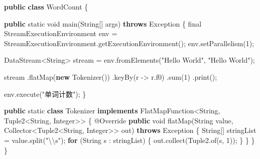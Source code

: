 \documentclass[cn,11pt,chinese]{elegantbook}
\newenvironment{Shaded}{}{}
\newcommand{\AttributeTok}[1]{\textcolor[rgb]{0.49,0.56,0.16}{#1}}
\newcommand{\BuiltInTok}[1]{#1}
\newcommand{\DataTypeTok}[1]{\textcolor[rgb]{0.56,0.13,0.00}{#1}}
\newcommand{\DecValTok}[1]{\textcolor[rgb]{0.25,0.63,0.44}{#1}}
\newcommand{\FunctionTok}[1]{\textcolor[rgb]{0.02,0.16,0.49}{#1}}
\newcommand{\KeywordTok}[1]{\textcolor[rgb]{0.00,0.44,0.13}{\textbf{#1}}}
\newcommand{\NormalTok}[1]{#1}
\newcommand{\SpecialCharTok}[1]{\textcolor[rgb]{0.25,0.44,0.63}{#1}}
\newcommand{\StringTok}[1]{\textcolor[rgb]{0.25,0.44,0.63}{#1}}
\begin{document}
\begin{Shaded}
\begin{Highlighting}[]
\KeywordTok{public} \KeywordTok{class}\NormalTok{ WordCount \{}

    \KeywordTok{public} \DataTypeTok{static} \DataTypeTok{void} \FunctionTok{main}\NormalTok{(}\BuiltInTok{String}\NormalTok{[] args) }\KeywordTok{throws} \BuiltInTok{Exception}\NormalTok{ \{}
        \DataTypeTok{final}\NormalTok{ StreamExecutionEnvironment env = StreamExecutionEnvironment.}\FunctionTok{getExecutionEnvironment}\NormalTok{();}
\NormalTok{        env.}\FunctionTok{setParallelism}\NormalTok{(}\DecValTok{1}\NormalTok{);}

\NormalTok{        DataStream\textless{}}\BuiltInTok{String}\NormalTok{\textgreater{} stream = env.}\FunctionTok{fromElements}\NormalTok{(}\StringTok{"Hello World"}\NormalTok{, }\StringTok{"Hello World"}\NormalTok{);}

\NormalTok{        stream}
\NormalTok{                .}\FunctionTok{flatMap}\NormalTok{(}\KeywordTok{new} \FunctionTok{Tokenizer}\NormalTok{())}
\NormalTok{                .}\FunctionTok{keyBy}\NormalTok{(r {-}\textgreater{} r.}\FunctionTok{f0}\NormalTok{)}
\NormalTok{                .}\FunctionTok{sum}\NormalTok{(}\DecValTok{1}\NormalTok{)}
\NormalTok{                .}\FunctionTok{print}\NormalTok{();}

\NormalTok{        env.}\FunctionTok{execute}\NormalTok{(}\StringTok{"单词计数"}\NormalTok{);}
\NormalTok{    \}}

    \KeywordTok{public} \DataTypeTok{static} \KeywordTok{class}\NormalTok{ Tokenizer }\KeywordTok{implements}\NormalTok{ FlatMapFunction\textless{}}\BuiltInTok{String}\NormalTok{, Tuple2\textless{}}\BuiltInTok{String}\NormalTok{, }\BuiltInTok{Integer}\NormalTok{\textgreater{}\textgreater{} \{}
        \AttributeTok{@Override}
        \KeywordTok{public} \DataTypeTok{void} \FunctionTok{flatMap}\NormalTok{(}\BuiltInTok{String}\NormalTok{ value, Collector\textless{}Tuple2\textless{}}\BuiltInTok{String}\NormalTok{, }\BuiltInTok{Integer}\NormalTok{\textgreater{}\textgreater{} out) }\KeywordTok{throws} \BuiltInTok{Exception}\NormalTok{ \{}
            \BuiltInTok{String}\NormalTok{[] stringList = value.}\FunctionTok{split}\NormalTok{(}\StringTok{"}\SpecialCharTok{\textbackslash{}\textbackslash{}}\StringTok{s"}\NormalTok{);}
            \KeywordTok{for}\NormalTok{ (}\BuiltInTok{String}\NormalTok{ s : stringList) \{}
\NormalTok{                out.}\FunctionTok{collect}\NormalTok{(Tuple2.}\FunctionTok{of}\NormalTok{(s, }\DecValTok{1}\NormalTok{));}
\NormalTok{            \}}
\NormalTok{        \}}
\NormalTok{    \}}
\NormalTok{\}}
\end{Highlighting}
\end{Shaded}
\end{document}
